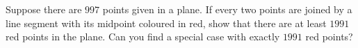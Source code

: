 Suppose there are $997$ points given in a plane. If every two points are joined by a line segment with its midpoint coloured in red, show that there are at least $1991$ red points in the plane.  Can you find a special case with exactly $1991$ red points?